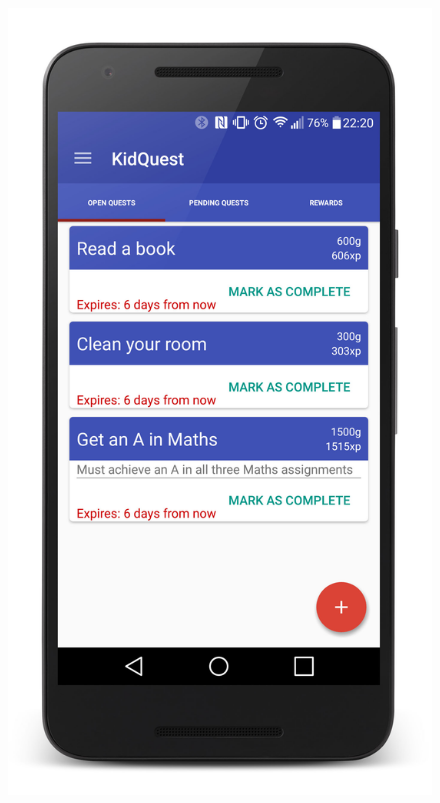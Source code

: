 \begin{figure}[ht] 
  \begin{minipage}[b]{0.25\linewidth}
    \centering
    \includegraphics[width=1\linewidth]{../images/Screenshot/YourQuestsScreen.jpg} 
    \vspace{2ex}
  \end{minipage}%
  \begin{minipage}[b]{0.25\linewidth}

\end{minipage}
\end{figure}
